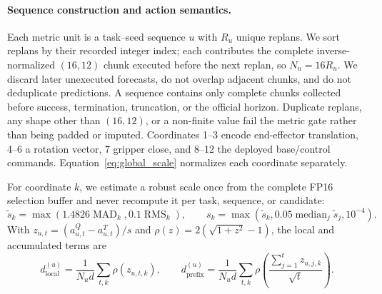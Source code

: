 \paragraph{Sequence construction and action semantics.}
Each metric unit is a task--seed sequence $u$ with $R_u$ unique replans. We sort replans by their recorded integer index; each contributes the complete inverse-normalized $(16,12)$ chunk executed before the next replan, so $N_u=16R_u$. We discard later unexecuted forecasts, do not overlap adjacent chunks, and do not deduplicate predictions. A sequence contains only complete chunks collected before success, termination, truncation, or the official horizon. Duplicate replans, any shape other than $(16,12)$, or a non-finite value fail the metric gate rather than being padded or imputed. Coordinates 1--3 encode end-effector translation, 4--6 a rotation vector, 7 gripper close, and 8--12 the deployed base/control commands. Equation~\ref{eq:global_scale} normalizes each coordinate separately.

For coordinate $k$, we estimate a robust scale once from the complete FP16 selection buffer and never recompute it per task, sequence, or candidate:
\begin{equation}
 \tilde{s}_k=\max\!\left(1.4826\operatorname{MAD}_k,0.1\operatorname{RMS}_k\right),\qquad
 s_k=\max\!\left(\tilde{s}_k,0.05\operatorname{median}_{j}\tilde{s}_j,10^{-4}\right).
 \label{eq:global_scale}
\end{equation}
With $z_{u,t}=(a^Q_{u,t}-a^T_{u,t})/s$ and $\rho(z)=2(\sqrt{1+z^2}-1)$, the local and accumulated terms are
\begin{equation}
 d_{\mathrm{local}}^{(u)}=\frac{1}{N_ud}\sum_{t,k}\rho(z_{u,t,k}),\qquad
 d_{\mathrm{prefix}}^{(u)}=\frac{1}{N_ud}\sum_{t,k}
 \rho\!\left(\frac{\sum_{j=1}^{t}z_{u,j,k}}{\sqrt{t}}\right).
 \label{eq:local_prefix}
\end{equation}

